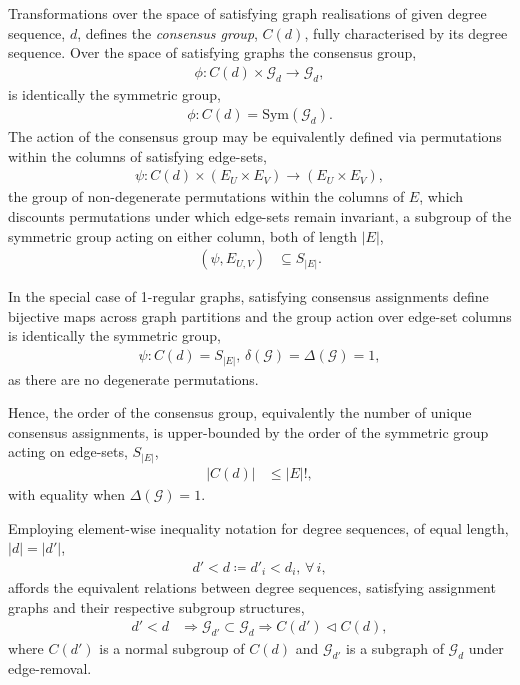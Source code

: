 \documentclass[twocolumn, aps, amsmath, amssymb, nofootinbib, superscriptaddress, longbibliography, floatfix, eqsecnum, rmp]{revtex4-2}
\begin{document}
Transformations over the space of satisfying graph realisations of given degree sequence, $d$, defines the \emph{consensus group}, $C(d)$, fully characterised by its degree sequence. Over the space of satisfying graphs the consensus group,
\begin{align}
	\phi: C(d)\times \mathcal{G}_d \to \mathcal{G}_d,
\end{align}
is identically the symmetric group,
\begin{align}
	\phi: C(d) = \mathrm{Sym}(\mathcal{G}_d).
\end{align}
The action of the consensus group may be equivalently defined via permutations within the columns of satisfying edge-sets,
\begin{align}
	\psi: C(d)\times (E_U\times E_V) \to (E_U\times E_V),
\end{align}
the group of non-degenerate permutations within the columns of $E$, which discounts permutations under which edge-sets remain invariant, a subgroup of the symmetric group acting on either column, both of length $|E|$,
\begin{align}
	(\psi, E_{U,V}) &\subseteq S_{|E|}.
\end{align}

In the special case of 1-regular graphs, satisfying consensus assignments define bijective maps across graph partitions and the group action over edge-set columns is identically the symmetric group,
\begin{align}
	\psi: C(d) = S_{|E|},\,\delta(\mathcal{G})=\Delta(\mathcal{G})=1,
\end{align}
as there are no degenerate permutations.

Hence, the order of the consensus group, equivalently the number of unique consensus assignments, is upper-bounded by the order of the symmetric group acting on edge-sets, $S_{|E|}$,
\begin{align} \label{eq:orbit_order}
	|C(d)| &\leq |E|!,
\end{align}
with equality when \mbox{$\Delta(\mathcal{G})=1$}.

Employing element-wise inequality notation for degree sequences, of equal length, \mbox{$|d|=|d'|$},
\begin{align}
	d' < d \coloneqq d'_i < d_i,\, \forall\, i,
\end{align}
affords the equivalent relations between degree sequences, satisfying assignment graphs and their respective subgroup structures,
\begin{align} \label{eq:sub_dgc}
	d' < d &\Rightarrow \mathcal{G}_{d'} \subset \mathcal{G}_d \Rightarrow C(d') \triangleleft C(d),
\end{align}
where $C(d')$ is a normal subgroup of $C(d)$ and $\mathcal{G}_{d'}$ is a subgraph of $\mathcal{G}_d$ under edge-removal.
\end{document}

